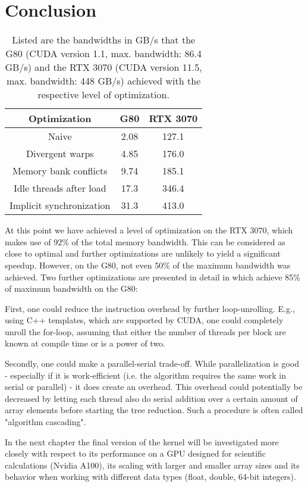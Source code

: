 \section{Conclusion}
\begin{table}
    \centering
    \begin{tabular}{|c|c|c|}
        \hline
        Optimization & G80 & RTX 3070 \\
        \hline
        Naive & 2.08 & 127.1 \\
        \hline
        Divergent warps & 4.85 & 176.0 \\
        \hline
        Memory bank conflicts & 9.74 & 185.1 \\
        \hline
        Idle threads after load & 17.3 & 346.4 \\
        \hline
        Implicit synchronization & 31.3 & 413.0 \\
        \hline
    \end{tabular}
    \caption{
        Listed are the bandwidths in GB/s that the G80 (CUDA version 1.1, max. bandwidth: 86.4 GB/s) and the RTX 3070 (CUDA version 11.5, max. bandwidth: 448 GB/s) achieved with the respective level of optimization.
    } \label{tab_reduce_performance}
\end{table}
At this point we have achieved a level of optimization on the RTX 3070, which makes use of 92\% of the total memory bandwidth.
This can be considered as close to optimal and further optimizations are unlikely to yield a significant speedup.
However, on the G80, not even 50\% of the maximum bandwidth was achieved.
Two further optimizations are presented in detail in \cite{Harris} which achieve 85\% of maximum bandwidth on the G80:

First, one could reduce the instruction overhead by further loop-unrolling.
E.g., using C++ templates, which are supported by CUDA, one could completely unroll the for-loop, assuming that either the number of threads per block are known at compile time or is a power of two.

Secondly, one could make a parallel-serial trade-off.
While parallelization is good - especially if it is work-efficient (i.e. the algorithm requires the same work in serial or parallel) - it does create an overhead.
This overhead could potentially be decreased by letting each thread also do serial addition over a certain amount of array elements before starting the tree reduction.
Such a procedure is often called "algorithm cascading".

In the next chapter the final version of the kernel will be investigated more closely with respect to its performance on a GPU designed for scientific calculations (Nvidia A100), its scaling with larger and smaller array sizes and its behavior when working with different data types (float, double, 64-bit integers).




